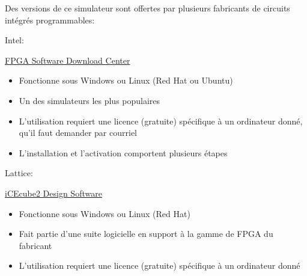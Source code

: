 \documentclass[11pt]{article}
\begin{document}
Des versions de ce simulateur sont offertes par plusieurs fabricants
de circuits intégrés programmables:

Intel: 

\href{https://www.intel.com/content/www/us/en/collections/products/fpga/software/downloads.html?s=Newest\&f=\%255B\%257B\%2522name\%2522\%3A\%2522quartusedition\%2522\%2C\%2522facetId\%2522\%3A\%2522quartusedition\%2522\%2C\%2522currentValues\%2522\%3A\%255B\%255D\%257D\%2C\%257B\%2522name\%2522\%3A\%2522quartusaddon\%2522\%2C\%2522facetId\%2522\%3A\%2522quartusaddon\%2522\%2C\%2522currentValues\%2522\%3A\%255B\%257B\%2522value\%2522\%3A\%2522Intel\%25C2\%25AE\%2520FPGA\%2520Simulation\%2520Tools\%2522\%2C\%2522state\%2522\%3A\%2522idle\%2522\%2C\%2522children\%2522\%3A\%255B\%257B\%2522value\%2522\%3A\%2522Questa*-Intel\%25C2\%25AE\%2520FPGA\%2520Starter\%2520Edition\%2522\%2C\%2522state\%2522\%3A\%2522selected\%2522\%257D\%255D\%257D\%255D\%257D\%2C\%257B\%2522name\%2522\%3A\%2522fpgadevicefamily\%2522\%2C\%2522facetId\%2522\%3A\%2522fpgadevicefamily\%2522\%2C\%2522currentValues\%2522\%3A\%255B\%255D\%257D\%2C\%257B\%2522name\%2522\%3A\%2522fpgaplatform\%2522\%2C\%2522facetId\%2522\%3A\%2522fpgaplatform\%2522\%2C\%2522currentValues\%2522\%3A\%255B\%255D\%257D\%2C\%257B\%2522facetId\%2522\%3A\%2522os-rdc\%2522\%2C\%2522name\%2522\%3A\%2522OperatingSystem\%2522\%2C\%2522currentValues\%2522\%3A\%255B\%255D\%257D\%2C\%257B\%2522facetId\%2522\%3A\%2522\%40emtcontenttype\_en\%2522\%2C\%2522name\%2522\%3A\%2522ContentType\%2522\%2C\%2522currentValues\%2522\%3A\%255B\%255D\%257D\%2C\%257B\%2522facetId\%2522\%3A\%2522lastupdated-rdc\%2522\%2C\%2522name\%2522\%3A\%2522lastupdated\%2522\%2C\%2522currentValues\%2522\%3A\%255B\%255D\%257D\%255D\&q=lite}{FPGA Software Download Center}


\begin{itemize}
\item Fonctionne sous Windows ou Linux (Red Hat ou Ubuntu)
\item Un des simulateurs les plus populaires
\item L'utilisation requiert une licence (gratuite) spécifique à un
ordinateur donné, qu'il faut demander par courriel
\item L'installation et l'activation comportent plusieurs étapes
\end{itemize}


Lattice:

\href{http://www.latticesemi.com/icecube2}{iCEcube2 Design Software}

\begin{itemize}
\item Fonctionne sous Windows ou Linux (Red Hat)
\item Fait partie d'une suite logicielle en support à la gamme de FPGA du
fabricant
\item L'utilisation requiert une licence (gratuite) spécifique à un
ordinateur donné
\end{itemize}
\end{document}
